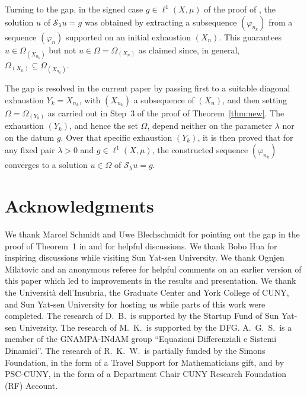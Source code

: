 \documentclass[letterpaper]{article}
\theoremstyle{definition}
\theoremstyle{named}
\numberwithin{equation}{section}
\begin{document}
Turning to the gap, in the signed  case $g \in \ell^1(X,\mu)$ of the proof of \cite[Theorem 1]{bianchi2022generalized}, the solution $u$ of $\mathcal{S}_\lambda u = g$ was obtained by extracting a subsequence $(\varphi_{n_k})$ from a sequence $(\varphi_n)$ supported on an initial exhaustion $(X_n)$. This guarantees $u \in \Omega_{(X_{n_k})}$ but not $u \in \Omega = \Omega_{(X_n)}$ as claimed since, in general, $\Omega_{(X_n)} \subseteq \Omega_{(X_{n_k})}$. 

The gap is resolved in the current paper by passing first to a suitable diagonal exhaustion $Y_k = X_{n_k}$, with $(X_{n_k})$ a subsequence of $(X_n)$, and then setting $\Omega = \Omega_{(Y_k)}$ as carried out in Step~3 of the proof of Theorem~\ref{thm:new}. The exhaustion $(Y_k)$, and hence the set $\Omega$, depend neither on the parameter $\lambda$ nor on the datum $g$. Over that specific exhaustion $(Y_k)$, it is then proved that for any fixed pair $\lambda >0$ 
and $g \in \ell^1(X,\mu)$, 
the constructed sequence $(\varphi_{n_k})$ converges to a solution 
$u\in \Omega$ of $\mathcal{S}_\lambda u = g$. 







\section*{Acknowledgments}
We thank Marcel Schmidt and Uwe Blechschmidt for pointing out the gap in the proof
of Theorem~1 in \cite{bianchi2022generalized} and for helpful discussions.
We thank Bobo Hua for inspiring discussions while visiting Sun Yat-sen University.
We thank Ognjen Milatovic and an anonymous referee for helpful comments
on an earlier version of this paper which led to improvements in the results
and presentation.
We thank the Universit\`a dell'Insubria, the Graduate Center and York College of CUNY, and Sun Yat-sen University 
for hosting us while parts of this work were completed.
The research of D.~B.~is  supported by the Startup Fund of Sun Yat-sen University.
The research of M.~K.~is supported by the DFG.
A.~G.~S.~is a member of the GNAMPA-INdAM group {``Equazioni Differenziali e Sistemi Dinamici''}.
The research of R.~K.~W.~is partially funded by the Simons Foundation, in the form
of a Travel Support for Mathematicians gift, and by PSC-CUNY, in the form
of a Department Chair CUNY Research Foundation (RF) Account. 
\printbibliography
\end{document}
